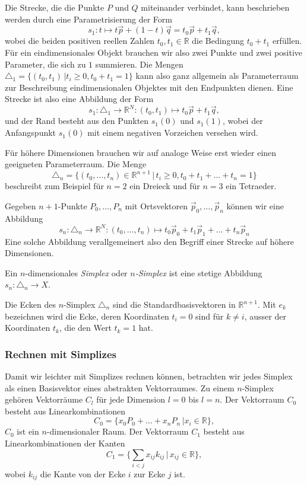 Die Strecke, die die Punkte $P$ und $Q$ miteinander verbindet,
kann beschrieben werden durch eine Parametrisierung
der Form
\begin{equation}
s_1
\colon
t
\mapsto
t\vec{p} + (1-t) \vec{q}
=
t_0 \vec{p} + t_1\vec{q},
\end{equation}
wobei die beiden positiven reellen Zahlen $t_0,t_1\in\mathbb{R}$ die
Bedingung $t_0+t_1$ erfüllen.
Für ein eindimensionales Objekt brauchen wir also zwei Punkte und zwei
positive Parameter, die sich zu $1$ summieren.
Die Mengen $\triangle_1=\{ (t_0,t_1)\,|t_i\ge 0, t_0+t_1=1\}$ kann also
ganz allgemein als Parameterraum zur Beschreibung eindimensionalen Objektes
mit den Endpunkten dienen.
Eine Strecke ist also eine Abbildung der Form
\begin{equation}
s_1
\colon
\triangle_1 \to \mathbb{R}^N
:
(t_0,t_1)
\mapsto
t_0 \vec{p} + t_1\vec{q},
\end{equation}
und der Rand besteht aus den Punkten $s_1(0)$ und $s_1(1)$, wobei der
Anfangspunkt $s_1(0)$ mit einem negativen Vorzeichen versehen wird.

Für höhere Dimensionen brauchen wir auf analoge Weise erst wieder einen
geeigneten Parameterraum.
Die Menge
\[
\triangle_n
=
\{(t_0,\dots,t_n)\in\mathbb{R}^{n+1}\,|\, t_i\ge 0,t_0+t_1+\dots+t_n=1\}
\]
beschreibt zum Beispiel für $n=2$ ein Dreieck und für $n=3$ ein 
Tetraeder.

Gegeben $n+1$-Punkte $P_0,\dots,P_n$ mit Ortsvektoren
$\vec{p}_0,\dots,\vec{p}_n$ können wir eine Abbildung
\begin{equation}
s_n
\colon
\triangle_n
\to
\mathbb{R}^N
:
(t_0,\dots,t_n)
\mapsto
t_0\vec{p}_0
+
t_1\vec{p}_1
+
\dots
+
t_n\vec{p}_n
\end{equation}
Eine solche Abbildung verallgemeinert also den Begriff einer Strecke
auf höhere Dimensionen.

\begin{definition}
\label{buch:def:simplex}
Ein $n$-dimensionales {\em Simplex} oder {\em $n$-Simplex} ist eine
stetige Abbildung $s_n\colon\triangle_n\to X$.
\end{definition}

Die Ecken des $n$-Simplex $\triangle_n$ sind die Standardbasisvektoren
in $\mathbb{R}^{n+1}$.
Mit $e_k$ bezeichnen wird die Ecke, deren Koordinaten $t_i=0$ sind für 
$k\ne i$, ausser der Koordinaten $t_k$, die den Wert $t_k=1$ hat.

\subsubsection{Rechnen mit Simplizes}
Damit wir leichter mit Simplizes rechnen können, betrachten wir
jedes Simplex als einen Basisvektor eines abstrakten Vektorraumes.
Zu einem $n$-Simplex gehören Vektorräume $C_l$ für jede Dimension
$l=0$ bis $l=n$.
Der Vektorraum $C_0$ besteht aus Linearkombinationen
\[
C_0 
=
\{ x_0 P_0 + \dots + x_n P_n \,| x_i\in\mathbb{R} \},
\]
$C_0$ ist ein $n$-dimensionaler Raum.
Der Vektorraum $C_1$ besteht aus Linearkombinationen der Kanten
\[
C_1 
=
\biggl\{
\sum_{i<j}
x_{ij} k_{ij}
\,
\bigg|
\,
x_{ij}\in\mathbb{R}
\biggr\},
\]
wobei $k_{ij}$ die Kante von der Ecke $i$ zur Ecke $j$ ist.

